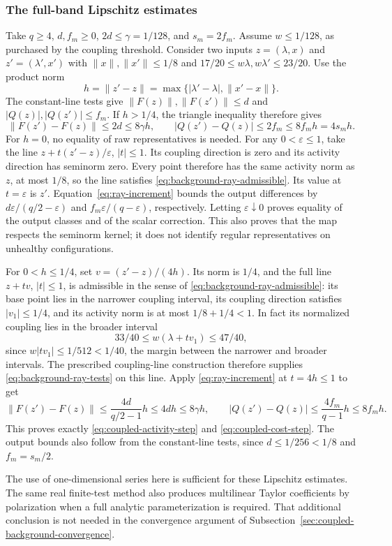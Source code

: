 \subsubsection{The full-band Lipschitz estimates}
Take $q\ge4$, $d,f_m\ge0$, $2d\le\gamma=1/128$, and $s_m=2f_m$.
Assume $w\le1/128$, as purchased by the coupling threshold.
Consider two inputs $z=(\lambda,x)$ and
$z'=(\lambda',x')$ with $\|x\|,\|x'\|\le1/8$ and
$17/20\le w\lambda,w\lambda'\le23/20$. Use the product
norm
\[
                 h=\|z'-z\|=\max\{|\lambda'-\lambda|,\|x'-x\|\}.
\]
The constant-line tests give $\|F(z)\|,\|F(z')\|\le d$
and $|Q(z)|,|Q(z')|\le f_m$. If $h>1/4$, the triangle
inequality therefore gives
\[
 \|F(z')-F(z)\|\le2d\le8\gamma h,
 \qquad |Q(z')-Q(z)|\le2f_m\le8f_m h=4s_mh.
\]
For $h=0$, no equality of raw representatives is needed.
For any $0<\varepsilon\le1$, take the line
$z+t(z'-z)/\varepsilon$, $|t|\le1$. Its coupling direction is
zero and its activity direction has seminorm zero. Every point
therefore has the same activity norm as $z$, at most $1/8$,
so the line satisfies \eqref{eq:background-ray-admissible}. Its
value at $t=\varepsilon$ is $z'$.
Equation~\eqref{eq:ray-increment} bounds the output differences
by $d\varepsilon/(q/2-\varepsilon)$ and
$f_m\varepsilon/(q-\varepsilon)$, respectively. Letting
$\varepsilon\downarrow0$ proves equality of the output classes
and of the scalar correction. This also proves that the map
respects the seminorm kernel; it does not identify regular
representatives on unhealthy configurations.

For $0<h\le1/4$, set $v=(z'-z)/(4h)$. Its norm is $1/4$,
and the full line $z+tv$, $|t|\le1$, is admissible in the sense of
\eqref{eq:background-ray-admissible}: its base point lies in the
narrower coupling interval, its coupling direction satisfies
$|v_1|\le1/4$, and its activity norm is at most $1/8+1/4<1$. In fact
its normalized coupling lies in the broader interval
\[
                   33/40\le w(\lambda+tv_1)\le47/40,
\]
since $w|tv_1|\le1/512<1/40$, the margin between the narrower
and broader intervals. The prescribed coupling-line construction
therefore supplies \eqref{eq:background-ray-tests} on this line.
Apply \eqref{eq:ray-increment} at $t=4h\le1$ to get
\[
 \|F(z')-F(z)\|\le\frac{4d}{q/2-1}h\le4dh\le8\gamma h,
 \qquad
 |Q(z')-Q(z)|\le\frac{4f_m}{q-1}h\le8f_mh.
\]
This proves exactly \eqref{eq:coupled-activity-step} and
\eqref{eq:coupled-cost-step}. The output bounds also follow from
the constant-line tests, since $d\le1/256<1/8$ and $f_m=s_m/2$.

The use of one-dimensional series here is sufficient for these
Lipschitz estimates. The same real finite-test method also produces
multilinear Taylor coefficients by polarization when a full analytic
parameterization is required. That additional conclusion is not
needed in the convergence argument of
Subsection~\ref{sec:coupled-background-convergence}.

